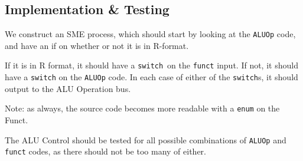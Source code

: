 \documentclass{beamer}
\begin{document}
\subsection{Implementation \& Testing}
\begin{frame}
    We construct an SME process, which should start by looking at the
    \texttt{ALUOp} code, and have an if on whether or not it is in R-format.

    \vspace{\baselineskip}
    If it is in R format, it should have a \texttt{switch} on the
    \texttt{funct} input. If not, it should have a \texttt{switch} on the
    \texttt{ALUOp} code. In each case of either of the \texttt{switch}s, it
    should output to the ALU Operation bus.

    \vspace{\baselineskip}
    Note: as always, the source code becomes more readable with a \texttt{enum}
    on the Funct.

    \vspace{\baselineskip}
    The ALU Control should be tested for all possible combinations of
    \texttt{ALUOp} and \texttt{funct} codes, as there should not be too many of
    either.
\end{frame}
\end{document}
